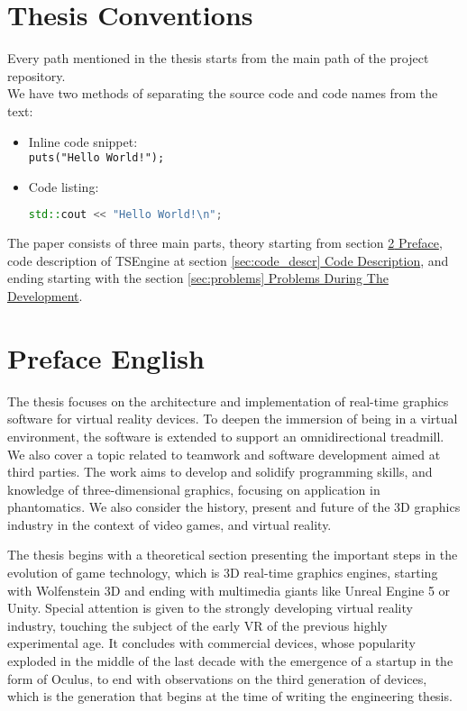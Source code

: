 \newpage
\section{Thesis Conventions}
Every path mentioned in the thesis starts from the main path of the project repository.\\
We have two methods of separating the source code and code names from the text:
\begin{itemize}
    \item Inline code snippet:\\
    \texttt{puts("Hello World!");}
    \item Code listing:
\begin{lstlisting}[language=c++, caption=Example code snippet (./example\_dir/example\_file.cpp)]
std::cout << "Hello World!\n";
\end{lstlisting}
\end{itemize}
The paper consists of three main parts, theory starting from section \hyperref[sec:preface]{\ref*{sec:preface} Preface}, code description of TSEngine at section \hyperref[sec:code_descr]{\ref*{sec:code_descr} Code Description}, and ending starting with the section \hyperref[sec:problems]{\ref*{sec:problems} Problems During The Development}.

\newpage
\section{Preface English} 
\label{sec:preface}
\hspace{\parindent}
The thesis focuses on the architecture and implementation of real-time graphics software for virtual reality devices. To deepen the immersion of being in a virtual environment, the software is extended to support an omnidirectional treadmill. We also cover a topic related to teamwork and software development aimed at third parties. The work aims to develop and solidify programming skills, and knowledge of three-dimensional graphics, focusing on application in phantomatics. We also consider the history, present and future of the 3D graphics industry in the context of video games, and virtual reality.

The thesis begins with a theoretical section presenting the important steps in the evolution of game technology, which is 3D real-time graphics engines, starting with Wolfenstein 3D and ending with multimedia giants like Unreal Engine 5 or Unity. Special attention is given to the strongly developing virtual reality industry, touching the subject of the early VR of the previous highly experimental age. It concludes with commercial devices, whose popularity exploded in the middle of the last decade with the emergence of a startup in the form of Oculus, to end with observations on the third generation of devices, which is the generation that begins at the time of writing the engineering thesis.

